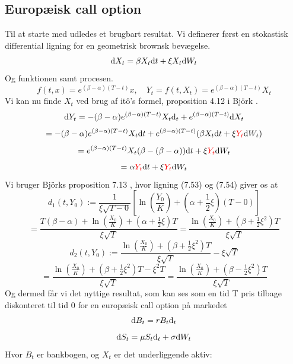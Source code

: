 \documentclass{article}
\theoremstyle{definition}
\theoremstyle{remark}
\begin{document}
\subsection{Europæisk call option}
Til at starte med udledes et brugbart resultat. Vi definerer først en stokastisk differential ligning for en geometrisk brownsk bevægelse.
$$\text d X_t = \beta X_t\text dt+\xi X_t \text dW_t$$
Og funktionen samt procesen.
$$f(t,x)=e^{(\beta-\alpha)(T-t)}x,\quad Y_t=f(t,X_t)=e^{(\beta-\alpha)(T-t)}X_t$$
Vi kan nu finde $X_t$ ved brug af itô's formel, proposition 4.12 i Björk \cite{Bjork2020}.
$$\text dY_t=-(\beta-\alpha)e^{(\beta-\alpha)(T-t)}X_t\text d_t+e^{(\beta-\alpha)(T-t)}\text dX_t$$
$$=-(\beta-\alpha)e^{(\beta-\alpha)(T-t)}X_t\text dt+e^{(\beta-\alpha)(T-t)}(\beta X_t\text dt+\xi \color{red}Y_t\color{black}\text dW_t)$$
$$=e^{(\beta-\alpha)(T-t)}X_t(\beta-(\beta-\alpha))\text dt+\xi \color{red}Y_t\color{black}\text dW_t$$
$$=\alpha\color{red}Y_t\color{black}\text dt+\xi \color{red}Y_t\color{black}\text dW_t$$
Vi bruger Björks proposition 7.13 \cite{Bjork2020}, hvor ligning (7.53) og (7.54) giver os at
$$d_1(t,Y_0) :=\frac{1}{\xi\sqrt{T-0}}\left[\ln\left(\frac{Y_0}{K}\right)+(\alpha+\frac12\xi)(T-0) \right]$$
$$=\frac{T(\beta-\alpha)+\ln\left(\frac{X_0}{K}\right)+(\alpha+\frac12\xi)T}{\xi\sqrt T}=\frac{\ln\left(\frac{X_0}{K}\right)+(\beta+\frac12\xi^2)T}{\xi\sqrt T}$$
$$d_2(t,Y_0):=\frac{\ln\left(\frac{X_0}{K}\right)+(\beta+\frac12\xi^2)T}{\xi\sqrt T}-\xi\sqrt{T}$$
$$=\frac{\ln\left(\frac{X_0}{K}\right)+(\beta+\frac12\xi^2)T-\xi^2T}{\xi\sqrt T}=\frac{\ln\left(\frac{X_0}{K}\right)+(\beta-\frac12\xi^2)T}{\xi\sqrt T}$$
Og dermed får vi det nyttige resultat, som kan ses som en tid T pris tilbage diskonteret til tid 0 for en europæisk call option\color{red} på markedet
$$\text dB_t = rB_t\text d_t$$
$$\text d S_t = \mu S_t\text d_t +\sigma \text dW_t$$
Hvor $B_t$ er bankbogen, og $X_t$ er det underliggende aktiv:
\end{document}
